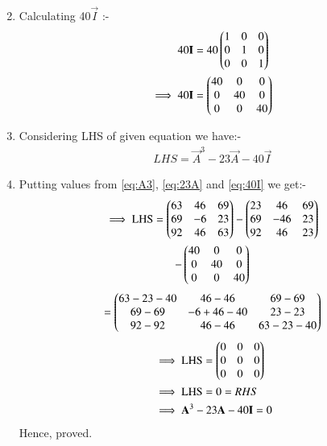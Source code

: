 \documentclass[journal,12pt,twocolumn]{IEEEtran}
\begin{document}
\begin{enumerate}
\begin{align}
\end{align}
\item Calculating 40$\vec{I}$ :-
\begin{align}
 40\mathbf{I}&=40\begin{pmatrix}1&0&0\\0&1&0\\0&0&1\end{pmatrix}
 \\
 \implies 40\mathbf{I}&=\begin{pmatrix}40&0&0\\0&40&0\\0&0&40\end{pmatrix}\label{eq:40I}
\end{align}
 \item Considering LHS of given equation we have:-
 \begin{align}
 LHS=\vec{A}^3-23\vec{A}-40\vec{I}   
 \end{align}
 \item Putting values from \eqref{eq:A3}, \eqref{eq:23A}
and \eqref{eq:40I} we get:-
\begin{multline}
\implies \text{LHS}=\begin{pmatrix}63&46&69\\69&-6&23\\92&46&63\end{pmatrix}-
\begin{pmatrix}23&46&69\\69&-46&23\\92&46&23\end{pmatrix}
\\-\begin{pmatrix}40&0&0\\0&40&0\\0&0&40\end{pmatrix}
\end{multline}
\begin{align}
=\begin{pmatrix}63-23-40&46-46&69-69\\69-69&-6+46-40&23-23\\92-92&46-46&63-23-40\end{pmatrix}
\end{align}
\begin{align}
&\implies \text{LHS}=\begin{pmatrix}0&0&0\\0&0&0\\0&0&0\end{pmatrix}
\\
&\implies \text{LHS}=0=RHS
\\
&\implies \mathbf{A}^3-23\mathbf{A}-40\mathbf{I}=0
\end{align}
Hence, proved.
\end{enumerate}
\end{document}
